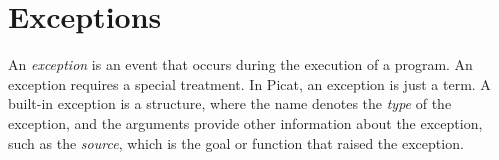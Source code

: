 \chapter{\label{chapter:exception}Exceptions}
An \emph{exception} is an event that occurs during the execution of a program.  An exception requires a special treatment. In Picat, an exception is just a term. A built-in exception is a structure, where the name denotes the \emph{type} of the exception, and the arguments provide other information about the exception, such as the \emph{source}, which is the goal or function that raised the exception. 


